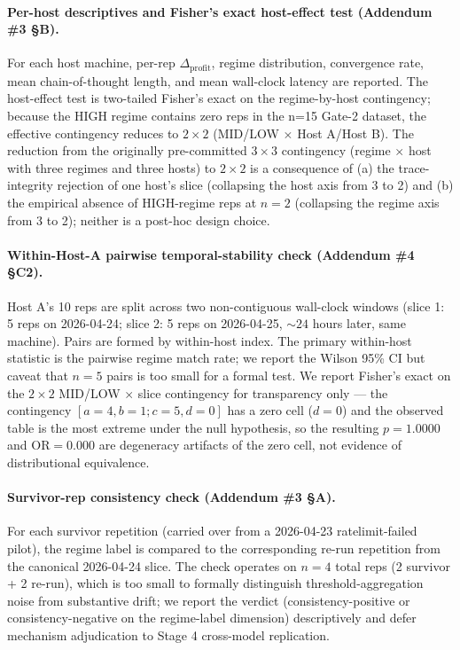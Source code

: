 \paragraph{Per-host descriptives and Fisher's exact host-effect test (Addendum \#3 \S B).}
For each host machine, per-rep $\Delta_{\text{profit}}$, regime distribution, convergence rate, mean chain-of-thought length, and mean wall-clock latency are reported. The host-effect test is two-tailed Fisher's exact on the regime-by-host contingency; because the HIGH regime contains zero reps in the n=15 Gate-2 dataset, the effective contingency reduces to $2 \times 2$ (MID/LOW $\times$ Host A/Host B). The reduction from the originally pre-committed $3 \times 3$ contingency (regime $\times$ host with three regimes and three hosts) to $2 \times 2$ is a consequence of (a) the trace-integrity rejection of one host's slice (collapsing the host axis from 3 to 2) and (b) the empirical absence of HIGH-regime reps at $n = 2$ (collapsing the regime axis from 3 to 2); neither is a post-hoc design choice.

\paragraph{Within-Host-A pairwise temporal-stability check (Addendum \#4 \S C2).}
Host A's 10 reps are split across two non-contiguous wall-clock windows (slice 1: 5 reps on 2026-04-24; slice 2: 5 reps on 2026-04-25, $\sim 24$ hours later, same machine). Pairs are formed by within-host index. The primary within-host statistic is the pairwise regime match rate; we report the Wilson 95\% CI but caveat that $n = 5$ pairs is too small for a formal test. We report Fisher's exact on the $2 \times 2$ MID/LOW $\times$ slice contingency for transparency only --- the contingency $[a=4, b=1; c=5, d=0]$ has a zero cell ($d = 0$) and the observed table is the most extreme under the null hypothesis, so the resulting $p = 1.0000$ and $\text{OR} = 0.000$ are degeneracy artifacts of the zero cell, not evidence of distributional equivalence.

\paragraph{Survivor-rep consistency check (Addendum \#3 \S A).}
For each survivor repetition (carried over from a 2026-04-23 ratelimit-failed pilot), the regime label is compared to the corresponding re-run repetition from the canonical 2026-04-24 slice. The check operates on $n = 4$ total reps (2 survivor + 2 re-run), which is too small to formally distinguish threshold-aggregation noise from substantive drift; we report the verdict (consistency-positive or consistency-negative on the regime-label dimension) descriptively and defer mechanism adjudication to Stage 4 cross-model replication.

